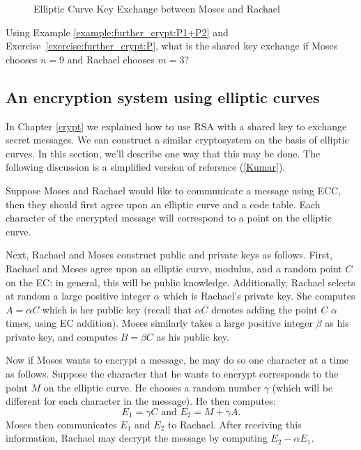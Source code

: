 \begin{figure}[htbp]
	  \caption{\label{fig:DH:DHKE_8} Elliptic Curve Key Exchange between Moses and Rachael }
\end{figure}

\begin{exer}
Using Example \ref{example:further_crypt:P1+P2} and Exercise~\ref{exercise:further_crypt:P}, what is the shared key exchange if Moses chooses $n = 9$ and Rachael chooses $m = 3$?
\end{exer}
\subsection{An encryption system using elliptic curves} 
In Chapter \ref{crypt} we explained how to use RSA with a shared key to exchange secret messages.  We can construct a similar cryptosystem on the basis of elliptic curves. In this section, we'll describe one way that this may be done. The following discussion is a simplified version of reference (\ref{Kumar}).

Suppose Moses and Rachael would like to communicate a message using ECC, then they should first agree upon an elliptic curve and a code table. Each character of the encrypted message will correspond to a point on the elliptic curve.

Next, Rachael and Moses construct public and private keys as follows. First, Rachael and Moses agree upon an elliptic curve, modulus, and a random point $C$ on the EC: in general, this will be public knowledge.  Additionally, Rachael selects at  random a large positive integer $\alpha$ which is  Rachael's private key. She computes $A = \alpha C$ which is her public key (recall that $\alpha C$ denotes adding the point $C$ $\alpha$ times, using EC addition). Moses similarly takes a large positive integer $\beta$ as his private key, and computes $B = \beta C$ as his public key.

Now if Moses wants to encrypt a message, he may do so one character at a time as follows. Suppose the character that he wants to encrypt corresponds to the point $M$ on the elliptic curve.   He chooses a random number $\gamma$ (which will be different for each character in the message). He then computes:
\[
E_1=\gamma C \text{   and   }
E_2 = M +  \gamma A. 
\]
Moses then communicates $E_1$ and $E_2$ to  Rachael.  After receiving this information, Rachael may decrypt the message by computing $E_2 - \alpha E_1$.

